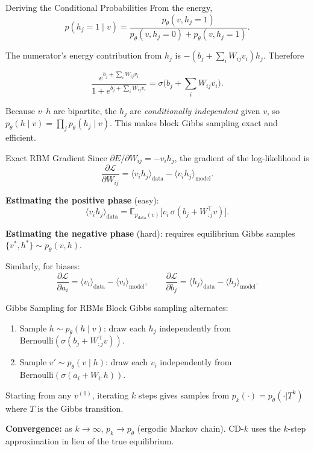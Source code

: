 \documentclass[aspectratio=169]{beamer}
\newcommand{\E}{\mathbb{E}}
\newcommand{\sigmoid}{\sigma}
\newcommand{\pdata}{p_{\mathrm{data}}}
\begin{document}
\begin{frame}{Deriving the Conditional Probabilities}
From the energy,
\[
  p(h_j=1\mid v)
  = \frac{p_\theta(v, h_j=1)}{p_\theta(v,h_j=0)+p_\theta(v,h_j=1)}.
\]

The numerator's energy contribution from $h_j$ is
$-(b_j + \sum_i W_{ij}v_i)h_j$.  Therefore

\[
  \frac{e^{b_j+\sum_i W_{ij}v_i}}{1 + e^{b_j+\sum_i W_{ij}v_i}}
  = \sigmoid\!\bigl(b_j + \textstyle\sum_i W_{ij}v_i\bigr).
\]

Because $v$--$h$ are bipartite, the $h_j$ are \emph{conditionally independent}
given $v$, so $p_\theta(h\mid v) = \prod_j p_\theta(h_j\mid v)$.
This makes block Gibbs sampling exact and efficient.
\end{frame}

\begin{frame}{Exact RBM Gradient}
Since $\partial E/\partial W_{ij} = -v_i h_j$, the gradient of the log-likelihood is
\[
  \frac{\partial\mathcal{L}}{\partial W_{ij}}
  = \langle v_i h_j\rangle_{\mathrm{data}}
    - \langle v_i h_j\rangle_{\mathrm{model}}.
\]

\textbf{Estimating the positive phase} (easy):
\[
  \langle v_i h_j\rangle_{\mathrm{data}}
  = \E_{\pdata(v)}\bigl[v_i\,\sigmoid(b_j+W_{:j}^\top v)\bigr].
\]

\textbf{Estimating the negative phase} (hard): requires equilibrium Gibbs
samples $\{v^*,h^*\}\sim p_\theta(v,h)$.

Similarly, for biases:
\[
  \frac{\partial\mathcal{L}}{\partial a_i}
  = \langle v_i\rangle_{\mathrm{data}} - \langle v_i\rangle_{\mathrm{model}},
  \qquad
  \frac{\partial\mathcal{L}}{\partial b_j}
  = \langle h_j\rangle_{\mathrm{data}} - \langle h_j\rangle_{\mathrm{model}}.
\]
\end{frame}

\begin{frame}{Gibbs Sampling for RBMs}
Block Gibbs sampling alternates:
\begin{enumerate}
  \item Sample $h \sim p_\theta(h\mid v)$: draw each $h_j$ independently
        from $\mathrm{Bernoulli}(\sigmoid(b_j+W_{:j}^\top v))$.
  \item Sample $v' \sim p_\theta(v\mid h)$: draw each $v_i$ independently
        from $\mathrm{Bernoulli}(\sigmoid(a_i+W_{i:}h))$.
\end{enumerate}

\medskip
Starting from any $v^{(0)}$, iterating $k$ steps gives samples from
$p_k(\cdot) = p_\theta(\cdot|T^k)$ where $T$ is the Gibbs transition.

\textbf{Convergence:} as $k\to\infty$, $p_k\to p_\theta$ (ergodic Markov chain).
CD-$k$ uses the $k$-step approximation in lieu of the true equilibrium.
\end{frame}
\end{document}

